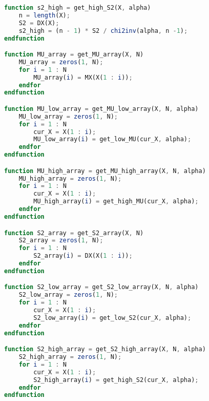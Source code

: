 \begin{lstlisting}[language=octave]
function s2_high = get_high_S2(X, alpha)
	n = length(X);
	S2 = DX(X);
	s2_high = (n - 1) * S2 / chi2inv(alpha, n -1);
endfunction

function MU_array = get_MU_array(X, N)
	MU_array = zeros(1, N);
	for i = 1 : N
		MU_array(i) = MX(X(1 : i));
	endfor
endfunction

function MU_low_array = get_MU_low_array(X, N, alpha)
	MU_low_array = zeros(1, N);
	for i = 1 : N
		cur_X = X(1 : i);
		MU_low_array(i) = get_low_MU(cur_X, alpha); 
	endfor
endfunction

function MU_high_array = get_MU_high_array(X, N, alpha)
	MU_high_array = zeros(1, N);
	for i = 1 : N
		cur_X = X(1 : i);
		MU_high_array(i) = get_high_MU(cur_X, alpha); 
	endfor
endfunction

function S2_array = get_S2_array(X, N)
	S2_array = zeros(1, N);
	for i = 1 : N
		S2_array(i) = DX(X(1 : i));
	endfor
endfunction

function S2_low_array = get_S2_low_array(X, N, alpha)
	S2_low_array = zeros(1, N);
	for i = 1 : N
		cur_X = X(1 : i);
		S2_low_array(i) = get_low_S2(cur_X, alpha);
	endfor
endfunction

function S2_high_array = get_S2_high_array(X, N, alpha)
	S2_high_array = zeros(1, N);
	for i = 1 : N
		cur_X = X(1 : i);
		S2_high_array(i) = get_high_S2(cur_X, alpha);
	endfor
endfunction
\end{lstlisting}